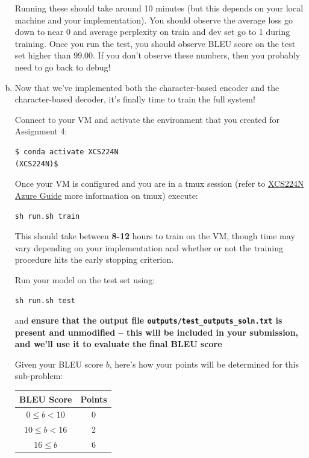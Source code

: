 \begin{enumerate}[(a)]
    Running these should take around 10 minutes (but this depends on your local machine and your implementation). 
    You should observe the average loss go down to near 0 and average perplexity on train and dev set go to 1 during training. Once you run the test, you should observe BLEU score on the test set higher than 99.00. 
    If you don't observe these numbers, then you probably need to go back to debug!
    
    \item {} \label{qn:final_train} Now that we've implemented both the character-based encoder and the character-based decoder, it's finally time to train the full system!

    Connect to your VM and activate the environment that you created for Assignment 4:
\begin{lstlisting}
$ conda activate XCS224N
(XCS224N)$
\end{lstlisting}

        Once your VM is configured and you are in a tmux session (refer to \href{https://docs.google.com/document/d/10J520Vnb1LnAMo0qgSYpG5cEEbomqQ371NIqg1IAv-4/edit?usp=sharing}{XCS224N Azure Guide} more information on tmux) execute:
        \begin{center}
            \texttt{sh run.sh train}
        \end{center}
    This should take between \textbf{8-12} hours to train on the VM, though time may vary depending on your implementation and whether or not the training procedure hits the early stopping criterion. 
    
    Run your model on the test set using:
        \begin{center}
            \texttt{sh run.sh test}
        \end{center}
    and \textbf{ensure that the output file \texttt{outputs/test\_outputs\_soln.txt} is present and unmodified -- this will be included in your submission, and we'll use it to evaluate the final BLEU score}
    
    Given your BLEU score $b$, here's how your points will be determined for this sub-problem: \newline \\
    \begin{tabular}{c c}
        BLEU Score & Points \\ \hline 
        $0 \le b < 10 $ & 0 \\ %
        $10 \le b < 16$ & 2 \\ %
        $16 \le b$ & 6 \\ %
    \end{tabular}

\end{enumerate}
\clearpage

